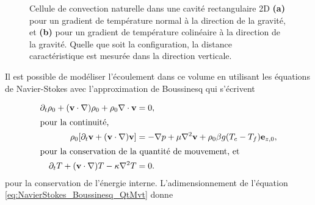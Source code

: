 \begin{figure}[!ht]
    \centering
    
    \caption{Cellule de convection naturelle dans une cavité rectangulaire 2D \textbf{(a)} pour un gradient de température normal à la direction de la gravité, et \textbf{(b)} pour un gradient de température colinéaire à la direction de la gravité. Quelle que soit la configuration, la distance caractéristique est mesurée dans la direction verticale.}
    \label{fig:SimuConvNat2D}
\end{figure}



Il est possible de modéliser l'écoulement dans ce volume en utilisant les équations de Navier-Stokes avec l'approximation de Boussinesq qui s'écrivent

\begin{subequations} %
	\begin{align}
		\partial_t \rho_0 + (\mathbf v \cdot \nabla)\rho_0 + \rho_0 \nabla \cdot \mathbf{v} &= 0, \label{eq:NavierStokes_Boussinesq_Conti}\\
		\intertext{pour la continuité,}
		\rho_0 [\partial_t \mathbf v + (\mathbf v \cdot \nabla)\mathbf v] &= -\nabla p + \mu \nabla^2 \mathbf v + \rho_0\beta g(T_c-T_f) \mathbf e_{z,0}, \label{eq:NavierStokes_Boussinesq_QtMvt}\\
		\intertext{pour la conservation de la quantité de mouvement, et}
		\partial_t T + (\mathbf v \cdot \nabla) T - \kappa\nabla^2T &= 0. \label{eq:NavierStokes_Boussinesq_NRJinterne}
	\end{align}
	\label{eq:NavierStokes_Boussinesq}%
\end{subequations}
pour la conservation de l'énergie interne. L'adimensionnement de l'équation \eqref{eq:NavierStokes_Boussinesq_QtMvt} donne

